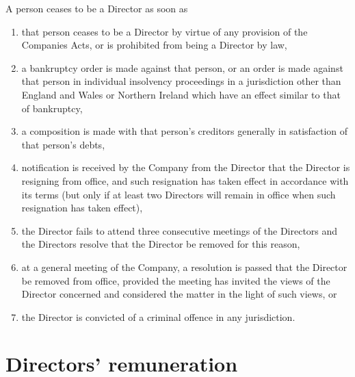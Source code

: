 \documentclass[a4paper,12pt]{article}
\renewcommand{\labelenumi}{\thesection.\arabic{enumi}}
\begin{document}
A person ceases to be a Director as soon as

\begin{enumerate}
  \renewcommand{\labelenumi}{(\alph{enumi})}
  \item that person ceases to be a Director by virtue of any provision of the Companies Acts, or is prohibited from being a Director by law,
  \item a bankruptcy order is made against that person, or an order is made against that person in individual insolvency proceedings in a jurisdiction other than England and Wales or Northern Ireland which have an effect similar to that of bankruptcy,
  \item a composition is made with that person's creditors generally in satisfaction of that person's debts,
  \item notification is received by the Company from the Director that the Director is resigning from office, and such resignation has taken effect in accordance with its terms (but only if at least two Directors will remain in office when such resignation has taken effect),
  \item the Director fails to attend three consecutive meetings of the Directors and the Directors resolve that the Director be removed for this reason,
  \item at a general meeting of the Company, a resolution is passed that the Director be removed from office, provided the meeting has invited the views of the Director concerned and considered the matter in the light of such views, or
  \item the Director is convicted of a criminal offence in any jurisdiction. %
\end{enumerate}

\section{Directors' remuneration}
\end{document}
